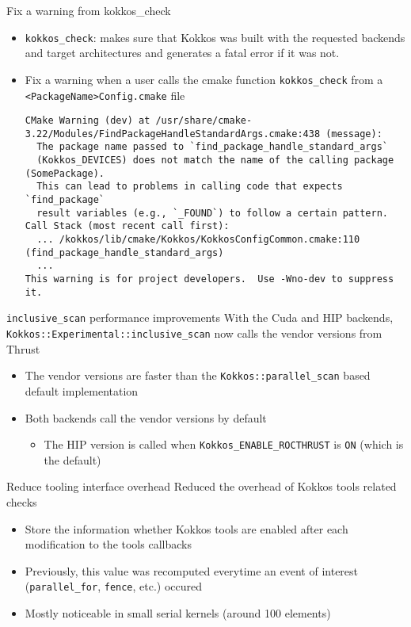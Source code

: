 \begin{frame}[fragile]{Fix a warning from kokkos\_check}
 \begin{itemize}
    \item \texttt{kokkos\_check}: makes sure that Kokkos was built with the requested backends and target architectures and generates a fatal error if it was not.
    \item Fix a warning when a user calls the cmake function \texttt{kokkos\_check} from a \texttt{<PackageName>Config.cmake} file
    {\tiny \begin{verbatim}
CMake Warning (dev) at /usr/share/cmake-3.22/Modules/FindPackageHandleStandardArgs.cmake:438 (message):
  The package name passed to `find_package_handle_standard_args`
  (Kokkos_DEVICES) does not match the name of the calling package (SomePackage).
  This can lead to problems in calling code that expects `find_package`
  result variables (e.g., `_FOUND`) to follow a certain pattern.
Call Stack (most recent call first):
  ... /kokkos/lib/cmake/Kokkos/KokkosConfigCommon.cmake:110 (find_package_handle_standard_args)
  ...
This warning is for project developers.  Use -Wno-dev to suppress it.
    \end{verbatim}}
 \end{itemize}
\end{frame}

\begin{frame}[fragile]{\texttt{inclusive\_scan} performance improvements}
  With the Cuda and HIP backends, \texttt{Kokkos::Experimental::inclusive\_scan} now calls the vendor versions from Thrust
  \begin{itemize}
     \item The vendor versions are faster than the \texttt{Kokkos::parallel\_scan} based default implementation
     \item Both backends call the vendor versions by default
       \begin{itemize}
         \item The HIP version is called when \texttt{Kokkos\_ENABLE\_ROCTHRUST} is \texttt{ON} (which is the default)
       \end{itemize}
  \end{itemize}
\end{frame}

\begin{frame}[fragile]{Reduce tooling interface overhead}
  Reduced the overhead of Kokkos tools related checks
  \begin{itemize}
      \item Store the information whether Kokkos tools are enabled after each modification to the tools callbacks
      \item Previously, this value was recomputed everytime an event of interest (\texttt{parallel\_for}, \texttt{fence}, etc.) occured
      \item Mostly noticeable in small serial kernels (around 100 elements)
  \end{itemize}
\end{frame}

